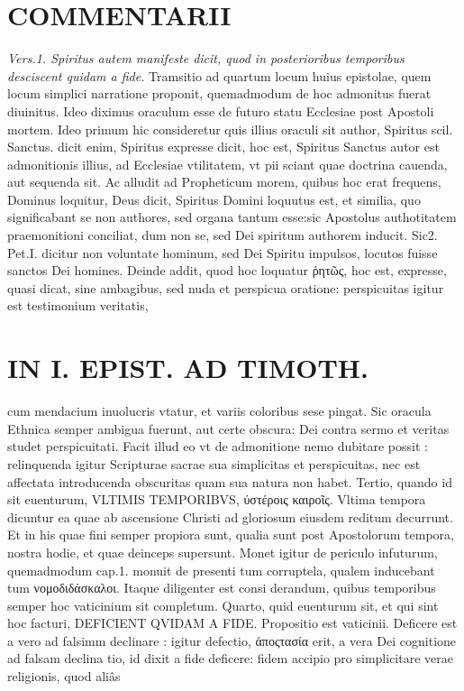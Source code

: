 \documentclass{article}
\begin{document}
\begin{pages}
\section*{COMMENTARII }
\marginpar{[ p.84 ]}
\textit{Vers.1. Spiritus autem manifeste dicit, quod in posterioribus temporibus desciscent quidam a fide. }\pstart Tramsitio ad quartum locum huius epistolae, quem locum simplici narratione proponit, quemadmodum de hoc admonitus fuerat diuinitus. Ideo diximus oraculum esse de futuro statu Ecclesiae post Apostoli mortem. Ideo primum hic consideretur quis illius oraculi sit author, Spiritus scil. Sanctus. dicit enim, Spiritus expresse dicit, hoc est, Spiritus Sanctus autor est admonitionis illius, ad Ecclesiae vtilitatem, vt pii sciant quae doctrina cauenda, aut sequenda sit.  \pend\pstart Ac alludit ad Propheticum morem, quibus hoc erat frequens, Dominus loquitur, Deus dicit, Spiritus Domini loquutus est, et similia, quo significabant se non authores, sed organa tantum esse:sic Apostolus authotitatem praemonitioni conciliat, dum non se, sed Dei spiritum authorem inducit. Sic2. Pet.I. dicitur non voluntate hominum, sed Dei Spiritu impulsos, locutos fuisse sanctos Dei homines.  \pend\pstart Deinde addit, quod hoc loquatur ῥητῶς, hoc est, expresse, quasi dicat, sine ambagibus, sed nuda et perspicua oratione: perspicuitas igitur est testimonium veritatis,  \pend
\section*{IN I. EPIST. AD TIMOTH. }
\marginpar{[ p.85 ]}\pstart cum mendacium inuolucris vtatur, et variis coloribus sese pingat. Sic oracula Ethnica semper ambigua fuerunt, aut certe obscura: Dei contra sermo et veritas studet perspicuitati. Facit illud eo vt de admonitione nemo dubitare possit : relinquenda igitur Scripturae sacrae sua simplicitas et perspicuitas, nec est affectata introducenda obscuritas quam sua natura non habet.  \pend\pstart Tertio, quando id sit euenturum, VLTIMIS TEMPORIBVS, ύστέροις καιροῖς. Vltima tempora dicuntur ea quae ab ascensione Christi ad gloriosum eiusdem reditum decurrunt. Et in his quae fini semper propiora sunt, qualia sunt post Apostolorum tempora, nostra hodie, et quae deinceps supersunt. Monet igitur de periculo infuturum, quemadmodum cap.1. monuit de presenti tum corruptela, qualem inducebant tum νομοδιδάσκαλοι. Itaque diligenter est consi derandum, quibus temporibus semper hoc vaticinium sit completum.  \pend\pstart Quarto, quid euenturum sit, et qui sint hoc facturi, DEFICIENT QVIDAM A FIDE. Propositio est vaticinii. Deficere est a vero ad falsimm declinare : igitur defectio, ἀποςτασία erit, a vera Dei cognitione ad falsam declina tio, id dixit a fide deficere: fidem accipio pro simplicitare verae religionis, quod aliâs  \pend

\end{pages}
\end{document}
